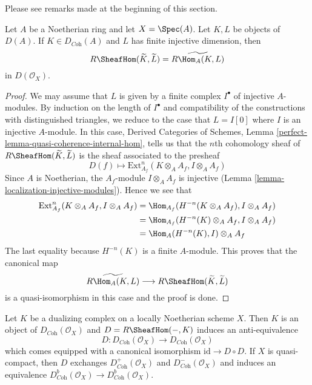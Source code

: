 \noindent
Please see remarks made at the beginning of this section.

\begin{lemma}
\label{lemma-affine-duality}
Let $A$ be a Noetherian ring and let $X = \Spec(A)$. Let $K, L$ be objects
of $D(A)$. If $K \in D_{\textit{Coh}}(A)$ and $L$ has finite injective
dimension, then
$$
R\SheafHom(\widetilde{K}, \widetilde{L})
=
\widetilde{R\Hom_A(K, L)}
$$
in $D(\mathcal{O}_X)$.
\end{lemma}

\begin{proof}
We may assume that $L$ is given by a finite complex $I^\bullet$
of injective $A$-modules. By induction on the length of $I^\bullet$
and compatibility of the constructions with distinguished triangles,
we reduce to the case that $L = I[0]$ where $I$ is an injective $A$-module.
In this case, Derived Categories of Schemes, Lemma
\ref{perfect-lemma-quasi-coherence-internal-hom}, tells us that
the $n$th cohomology sheaf of $R\SheafHom(\widetilde{K}, \widetilde{L})$
is the sheaf associated to the presheaf
$$
D(f) \longmapsto \text{Ext}^n_{A_f}(K \otimes_A A_f, I \otimes_A A_f)
$$
Since $A$ is Noetherian, the $A_f$-module $I \otimes_A A_f$ is injective
(Lemma \ref{lemma-localization-injective-modules}). Hence we see that
\begin{align*}
\text{Ext}^n_{A_f}(K \otimes_A A_f, I \otimes_A A_f)
& =
\Hom_{A_f}(H^{-n}(K \otimes_A A_f), I \otimes_A A_f) \\
& =
\Hom_{A_f}(H^{-n}(K) \otimes_A A_f, I \otimes_A A_f) \\
& =
\Hom_A(H^{-n}(K), I) \otimes_A A_f
\end{align*}
The last equality because $H^{-n}(K)$ is a finite $A$-module.
This proves that the canonical map
$$
\widetilde{R\Hom_A(K, L)}
\longrightarrow
R\SheafHom(\widetilde{K}, \widetilde{L})
$$
is a quasi-isomorphism in this case and the proof is done.
\end{proof}

\begin{lemma}
\label{lemma-dualizing-schemes}
Let $K$ be a dualizing complex on a locally Noetherian scheme $X$.
Then $K$ is an object of $D_{\textit{Coh}}(\mathcal{O}_X)$
and $D = R\SheafHom(-, K)$ induces an anti-equivalence
$$
D :
D_{\textit{Coh}}(\mathcal{O}_X)
\longrightarrow
D_{\textit{Coh}}(\mathcal{O}_X)
$$
which comes equipped with a canonical isomorphism
$\text{id} \to D \circ D$. If $X$ is quasi-compact, then
$D$ exchanges $D^+_{\textit{Coh}}(\mathcal{O}_X)$ and
$D^-_{\textit{Coh}}(\mathcal{O}_X)$ and induces an equivalence
$D^b_{\textit{Coh}}(\mathcal{O}_X) \to D^b_{\textit{Coh}}(\mathcal{O}_X)$.
\end{lemma}

